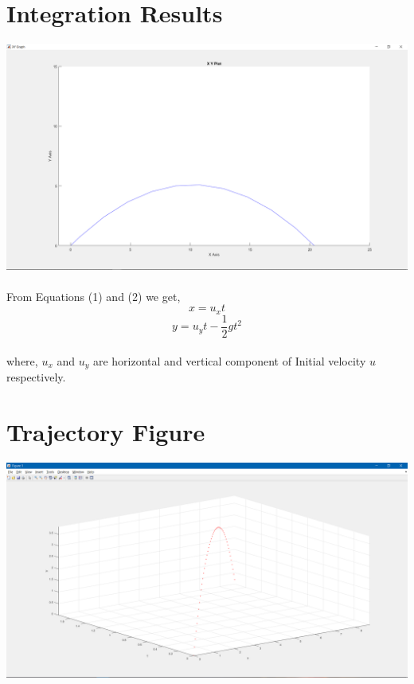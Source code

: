 \documentclass[11pt]{article}
\begin{document}
\section{Integration Results}
\includegraphics[scale=0.2]{integration_results.png}\\ 
\\From Equations (1) and (2) we get,
$$x=u_{x}t$$
$$y=u_{y}t-\frac{1}{2}gt^2$$\\
where, $u_{x}$ and $u_{y}$ are horizontal and vertical component of Initial velocity $u$ respectively.

\section{Trajectory Figure}
\includegraphics[scale=0.4]{Projectile.png} 
\end{document}
